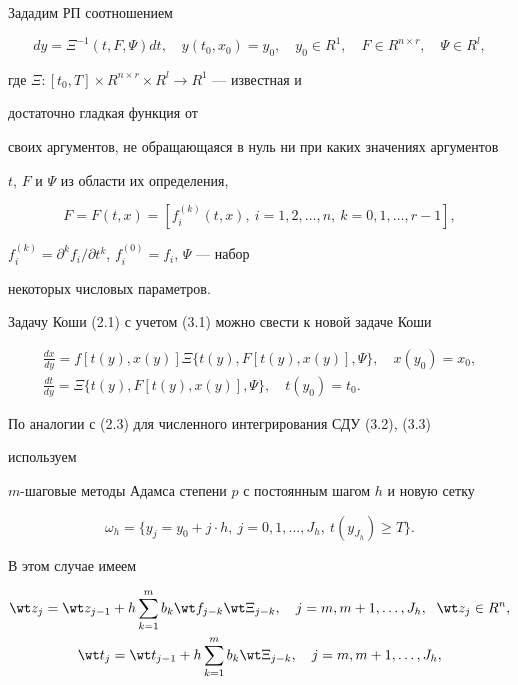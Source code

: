 Зададим РП соотношением 


\begin{equation} 


dy=\Xi^{-1}(t,F,\Psi)dt,\quad y(t_0,x_0)=y_0,\quad 


y_0\in R^1,\quad F\in R^{n\times r},\quad \Psi\in R^l, 


\end{equation} 


где $\Xi:[t_0,T]\times R^{n\times r}\times R^l\to R^1$ --- известная и 


достаточно гладкая функция от 


своих аргументов, не обращающаяся в нуль ни при каких значениях аргументов 


$t$, $F$ и $\Psi$ из области их определения, 


$$ 


F=F(t,x)=[f^{(k)}_i(t,x),\ i=1,2,\dotsc,n,\ k=0,1,\dotsc,r-1], 


$$ 


$f^{(k)}_i=\partial^k f_i/\partial t^k$, $f^{(0)}_i=f_i$, $\Psi$ --- набор 


некоторых числовых параметров. 


 


Задачу Коши (2.1) с учетом (3.1) можно свести к новой задаче Коши 


\begin{gather} 


\frac{dx}{dy}=f[t(y),x(y)]\Xi\{t(y),F[t(y),x(y)],\Psi\}, 


\quad x(y_0)=x_0,\\ 


\frac{dt}{dy}=\Xi\{t(y),F[t(y),x(y)],\Psi\},\quad t(y_0)=t_0. 


\end{gather} 


 


По аналогии с (2.3) для численного интегрирования СДУ (3.2), (3.3) 


используем 


$m$-шаговые методы Адамса степени $p$ с постоянным шагом $h$ и новую сетку 


$$ 


\omega_h=\{y_j=y_0+j\cdot h,\ j=0,1,\dotsc,J_h,\ t(y_{J_h})\ge T\}. 


$$ 


В этом случае имеем 


\begin{gather} 


\wt z_j=\wt z_{j-1}+h\sum^m_{k=1}b_k\wt f_{j-k} 


\wt\Xi_{j-k},\quad j=m,m+1,\dotsc,J_h,\ \; \wt z_j\in R^n,\\ 


% 


\wt t_j=\wt t_{j-1}+h\sum^m_{k=1}b_k\wt\Xi_{j-k},\quad 


j=m,m+1,\dotsc,J_h, 


\end{gather} 


